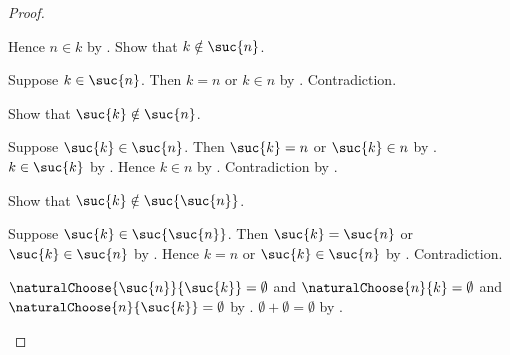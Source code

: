 \begin{proof}
\begin{byCase}
\begin{byCase}
                    Hence $n\in k$ by
                        .
                    Show that $k\notin\suc{n}$.
                    \begin{subproof}
                        Suppose $k\in\suc{n}$.
                        Then $k=n$ or $k\in n$ by .
                        Contradiction.
                    \end{subproof}
                    Show that $\suc{k}\notin\suc{n}$.
                    \begin{subproof}
                        Suppose $\suc{k}\in\suc{n}$.
                        Then $\suc{k}=n$ or $\suc{k}\in n$ by
                            .
                        $k\in\suc{k}$ by .
                        Hence $k\in n$ by
                            .
                        Contradiction by .
                    \end{subproof}
                    Show that $\suc{k}\notin\suc{\suc{n}}$.
                    \begin{subproof}
                        Suppose $\suc{k}\in\suc{\suc{n}}$.
                        Then $\suc{k}=\suc{n}$ or
                            $\suc{k}\in\suc{n}$ by .
                        Hence $k=n$ or $\suc{k}\in\suc{n}$ by
                            .
                        Contradiction.
                    \end{subproof}
                    $\naturalChoose{\suc{n}}{\suc{k}}=\emptyset$ and
                        $\naturalChoose{n}{k}=\emptyset$ and
                        $\naturalChoose{n}{\suc{k}}=\emptyset$ by
                        .
                    $\emptyset+\emptyset=\emptyset$ by
                        .
            \end{byCase}
    \end{byCase}
\end{proof}

